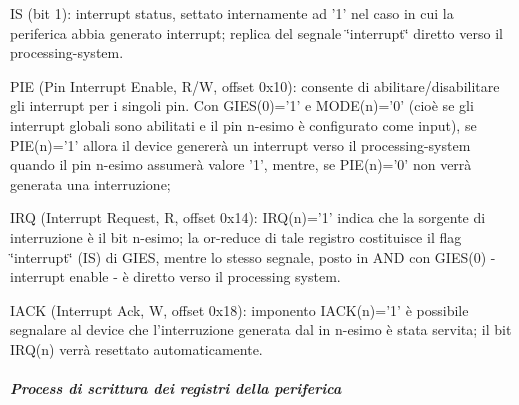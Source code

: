 \begin{DoxyItemize}
\begin{DoxyItemize}
\item I\+S (bit 1)\+: interrupt status, settato internamente ad '1' nel caso in cui la periferica abbia generato interrupt; replica del segnale \char`\"{}interrupt\char`\"{} diretto verso il processing-\/system.
\end{DoxyItemize}
\item P\+I\+E (Pin Interrupt Enable, R/\+W, offset 0x10)\+: consente di abilitare/disabilitare gli interrupt per i singoli pin. Con G\+I\+E\+S(0)='1' e M\+O\+D\+E(n)='0' (cioè se gli interrupt globali sono abilitati e il pin n-\/esimo è configurato come input), se P\+I\+E(n)='1' allora il device genererà un interrupt verso il processing-\/system quando il pin n-\/esimo assumerà valore '1', mentre, se P\+I\+E(n)='0' non verrà generata una interruzione;
\item I\+R\+Q (Interrupt Request, R, offset 0x14)\+: I\+R\+Q(n)='1' indica che la sorgente di interruzione è il bit n-\/esimo; la or-\/reduce di tale registro costituisce il flag \char`\"{}interrupt\char`\"{} (I\+S) di G\+I\+E\+S, mentre lo stesso segnale, posto in A\+N\+D con G\+I\+E\+S(0) -\/ interrupt enable -\/ è diretto verso il processing system.
\item I\+A\+C\+K (Interrupt Ack, W, offset 0x18)\+: imponento I\+A\+C\+K(n)='1' è possibile segnalare al device che l'interruzione generata dal in n-\/esimo è stata servita; il bit I\+R\+Q(n) verrà resettato automaticamente.
\end{DoxyItemize}

\subparagraph*{Process di scrittura dei registri della periferica}

